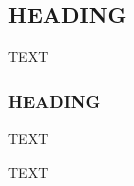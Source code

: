 \documentclass[gmd, preprint]{copernicus}
\begin{document}
\subsection{HEADING}
TEXT


\subsubsection{HEADING}
TEXT


\conclusions  %
TEXT












\appendix
\section{}    %

\subsection{}     %


\noappendix       %


\end{document}
